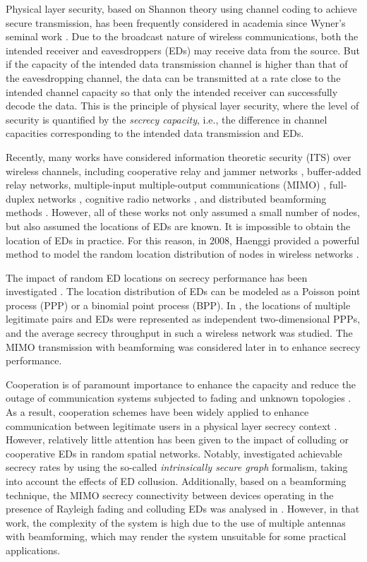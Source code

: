 \documentclass[10pt]{IEEEtran}
\begin{document}
Physical layer security, based on Shannon theory using channel coding to achieve secure transmission, has been frequently considered in academia since Wyner's seminal work \cite{A.D75}. Due to the broadcast nature of wireless communications, both the intended receiver and eavesdroppers (EDs) may receive data from the source. But if the capacity of the intended data transmission channel is higher than that of the eavesdropping channel, the data can be transmitted at a rate close to the intended channel capacity so that only the intended receiver can successfully decode the data. This is the principle of physical layer security, where the level of security is quantified by the \emph{secrecy capacity}, i.e., the difference in channel capacities corresponding to the intended data transmission and EDs.

Recently, many works have considered information theoretic security (ITS) over wireless channels, including cooperative relay and jammer networks \cite{E.T08,P.P09}, buffer-added relay networks\cite{G.C14}, multiple-input multiple-output communications (MIMO) \cite{T.L09,H.W09}, full-duplex networks \cite{G.C15}, cognitive radio networks \cite{G.C16}, and distributed beamforming methods \cite{L.D09}. However, all of these works not only assumed a small number of nodes, but also assumed the locations of EDs are known. It is impossible to obtain the location of EDs in practice. For this reason, in 2008, Haenggi provided a powerful method to model the random location distribution of nodes in wireless networks \cite{M.H08,P.C08}.

The impact of random ED locations on secrecy performance has been investigated \cite{X.Z11,G.G14,T.X14,M.G11,T.X15}. The location distribution of EDs can be modeled as a Poisson point process (PPP) or a binomial point process (BPP). In \cite{X.Z11}, the locations of multiple legitimate pairs and EDs were represented as independent two-dimensional PPPs, and the average secrecy throughput in such a wireless network was studied. The MIMO transmission with beamforming was considered later in \cite{G.G14,T.X14} to enhance secrecy performance.

Cooperation is of paramount importance to enhance the capacity and reduce the outage of communication systems subjected to fading and unknown topologies \cite{G.C13}.  As a result, cooperation schemes have been widely applied to enhance communication between legitimate users in a physical layer secrecy context \cite{E.T08,P.P09}. However, relatively little attention has been given to the impact of colluding or cooperative EDs in random spatial networks. Notably, \cite{P.C122} investigated achievable secrecy rates by using the so-called \emph{intrinsically secure graph} formalism, taking into account the effects of ED collusion. Additionally, based on a beamforming technique, the MIMO secrecy connectivity between devices operating in the presence of Rayleigh fading and colluding EDs was analysed in \cite{X.Z111}. However, in that work, the complexity of the system is high due to the use of multiple antennas with beamforming, which may render the system unsuitable for some practical applications.
\end{document}
